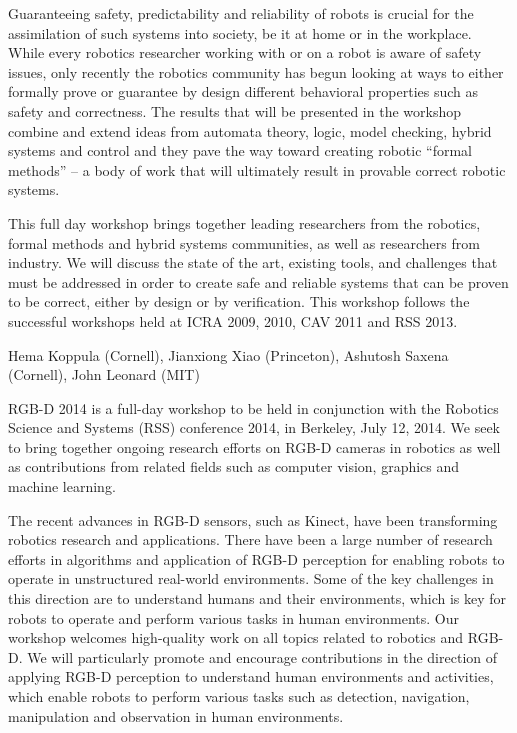 \begin{spacing}{1.0}
{Guaranteeing safety, predictability and reliability of robots is crucial for the assimilation of such systems into society, be it at home or in the workplace. While every robotics researcher working with or on a robot is aware of safety issues, only recently the robotics community has begun looking at ways to either formally prove or guarantee by design different behavioral properties such as safety and correctness. The results that will be presented in the workshop combine and extend ideas from automata theory, logic, model checking, hybrid systems and control and they pave the way toward creating robotic “formal methods” – a body of work that will ultimately result in provable correct robotic systems.


This full day workshop brings together leading researchers from the robotics, formal methods and hybrid systems communities, as well as researchers from industry. We will discuss the state of the art, existing tools, and challenges that must be addressed in order to create safe and reliable systems that can be proven to be correct, either by design or by verification. This workshop follows the successful workshops held at ICRA 2009, 2010, CAV 2011 and RSS 2013.
}

{Hema Koppula (Cornell), Jianxiong Xiao (Princeton), Ashutosh Saxena (Cornell), John Leonard (MIT)}
{
RGB-D 2014 is a full-day workshop to be held in conjunction with the Robotics Science and Systems (RSS) conference 2014, in Berkeley, July 12, 2014. We seek to bring together ongoing research efforts on RGB-D cameras in robotics as well as contributions from related fields such as computer vision, graphics and machine learning.

The recent advances in RGB-D sensors, such as Kinect, have been transforming robotics research and applications. There have been a large number of research efforts in algorithms and application of RGB-D perception for enabling robots to operate in unstructured real-world environments. Some of the key challenges in this direction are to understand humans and their environments, which is key for robots to operate and perform various tasks in human environments. Our workshop welcomes high-quality work on all topics related to robotics and RGB-D. We will particularly promote and encourage contributions in the direction of applying RGB-D perception to understand human environments and activities, which enable robots to perform various tasks such as detection, navigation, manipulation and observation in human environments.
}



\end{spacing}
